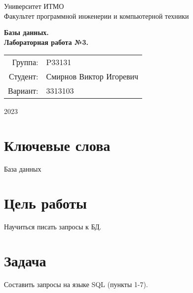 \documentclass{article}
\begin{document}
\begin{titlepage}
    \begin{center}
        \begin{spacing}{1.4}
            \large{Университет ИТМО} \\
            \large{Факультет программной инженерии и компьютерной техники} \
        \end{spacing}
        \vfill
        \textbf{
            \huge{Базы данных.} \\
            \huge{Лабораторная работа №3.} \\
        }
    \end{center}
    \vfill
    \begin{center}
        \begin{tabular}{r l}
            Группа:  & P33131                  \\
            Студент: & Смирнов Виктор Игоревич \\
            Вариант: & 3313103
        \end{tabular}
    \end{center}
    \vfill
    \begin{center}
        \begin{large}
            2023
        \end{large}
    \end{center}
\end{titlepage}

\section*{Ключевые слова}

База данных

\tableofcontents

\section{Цель работы}

Научиться писать запросы к БД.

\section{Задача}

Составить запросы на языке SQL (пункты 1-7).
\end{document}
